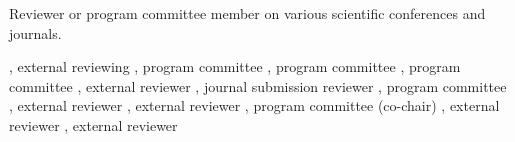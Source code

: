 \documentclass[9pt]{article}
\begin{document}



\medskip
{}

\noindent
Reviewer or program committee member on various scientific conferences and journals.

\noindent\newline{}, external reviewing 
\noindent\newline{}, program committee 
\noindent\newline{}, program committee 
\noindent\newline{}, program committee 
\noindent\newline{},
external reviewer 
\noindent\newline{},
journal submission reviewer 
\newline{},
program committee 
\newline{},
external reviewer 
\newline{},
external reviewer 
\newline{},
program committee (co-chair)
\newline{},
external reviewer 
\newline{},
external reviewer 
\end{document}
